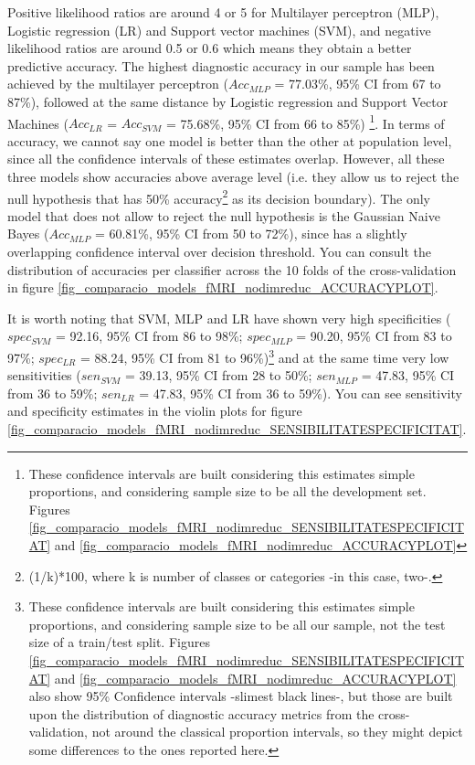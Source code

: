 \documentclass[a4paper,12pt]{elsarticle}  %
\begin{document}
		Positive likelihood ratios are around 4 or 5 for Multilayer perceptron (MLP), Logistic regression (LR) and Support vector machines (SVM), and negative likelihood ratios are around 0.5 or 0.6 which means they obtain a better predictive accuracy. The highest diagnostic accuracy in our sample has been achieved by the multilayer perceptron ($Acc_{MLP}$ = 77.03\%, 95\% CI from 67 to 87\%), followed at the same distance by Logistic regression and Support Vector Machines ($Acc_{LR}$ = $Acc_{SVM}$ = 75.68\%, 95\% CI from 66 to 85\%)	\footnote{These confidence intervals are built considering this estimates simple proportions, and considering sample size to be all the development set. Figures \ref{fig_comparacio_models_fMRI_nodimreduc_SENSIBILITATESPECIFICITAT} and \ref{fig_comparacio_models_fMRI_nodimreduc_ACCURACYPLOT}}. In terms of accuracy, we cannot say one model is better than the other at population level, since all the confidence intervals of these estimates overlap. However, all these three models show accuracies above average level (i.e. they allow us to reject the null hypothesis that has 50\% accuracy\footnote{(1/k)*100, where k is number of classes or categories -in this case, two-.} as its decision boundary). The only model that does not allow to reject the null hypothesis is the Gaussian Naive Bayes ($Acc_{MLP}$ = 60.81\%, 95\% CI from 50 to 72\%), since has a slightly overlapping confidence interval over decision threshold. You can consult the distribution of accuracies per classifier across the 10 folds of the cross-validation in figure \ref{fig_comparacio_models_fMRI_nodimreduc_ACCURACYPLOT}.
	



		



		
		It is worth noting that SVM, MLP and LR have shown very high specificities ($spec_{SVM}$ = 92.16, 95\% CI from 86 to 98\%; $spec_{MLP}$ = 90.20, 95\% CI from 83 to 97\%; $spec_{LR}$ = 88.24, 95\% CI from 81 to 96\%)\footnote{These confidence intervals are built considering this estimates simple proportions, and considering sample size to be all our sample, not the test size of a train/test split. Figures \ref{fig_comparacio_models_fMRI_nodimreduc_SENSIBILITATESPECIFICITAT} and \ref{fig_comparacio_models_fMRI_nodimreduc_ACCURACYPLOT}  also show 95\% Confidence intervals -slimest black lines-, but those are built upon the distribution of diagnostic accuracy metrics from the cross-validation, not around the classical proportion intervals, so they might depict some differences to the ones reported here.} and at the same time very low sensitivities ($sen_{SVM}$ = 39.13, 95\% CI from 28 to 50\%; $sen_{MLP}$ = 47.83, 95\% CI from 36 to 59\%; $sen_{LR}$ = 47.83, 95\% CI from 36 to 59\%). You can see sensitivity and specificity estimates in the violin plots for figure \ref{fig_comparacio_models_fMRI_nodimreduc_SENSIBILITATESPECIFICITAT}.
		
\end{document}
